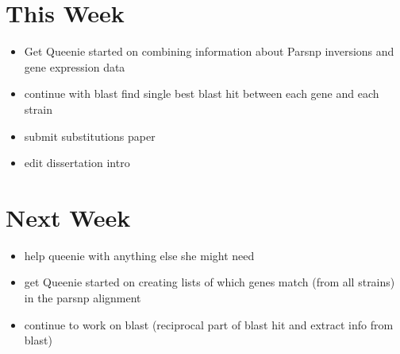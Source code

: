 \documentclass[12pt]{article}
\begin{document}

\section*{This Week}
%
\begin{itemize}
	\item Get Queenie started on combining information about Parsnp inversions and gene expression data
	\item continue with blast find single best blast hit between each gene and each strain
	\item submit substitutions paper
	\item edit dissertation intro
\end{itemize}


\section*{Next Week}
\begin{itemize}
	\item help queenie with anything else she might need
	\item get Queenie started on creating lists of which genes match (from all strains) in the parsnp alignment
	\item continue to work on blast (reciprocal part of blast hit and extract info from blast)
\end{itemize}

\newpage
\end{document}
